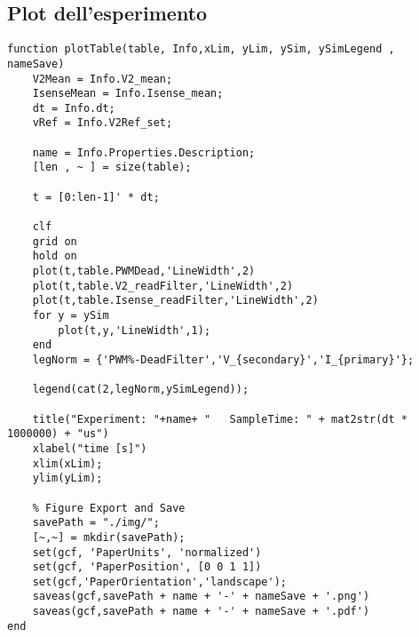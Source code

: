 \newpage

\subsection{Plot dell'esperimento}
\begin{lstlisting}[style=matlabStyle,caption={Plot dell'esperimento},label=lst:plotTable] 
function plotTable(table, Info,xLim, yLim, ySim, ySimLegend , nameSave)
	V2Mean = Info.V2_mean;
	IsenseMean = Info.Isense_mean;
	dt = Info.dt;
	vRef = Info.V2Ref_set;
	
	name = Info.Properties.Description;
	[len , ~ ] = size(table);
	
	t = [0:len-1]' * dt;
	
	clf
	grid on
	hold on
	plot(t,table.PWMDead,'LineWidth',2)
	plot(t,table.V2_readFilter,'LineWidth',2)
	plot(t,table.Isense_readFilter,'LineWidth',2)
	for y = ySim
		plot(t,y,'LineWidth',1);
	end
	legNorm = {'PWM%-DeadFilter','V_{secondary}','I_{primary}'};
	
	legend(cat(2,legNorm,ySimLegend));
	
	title("Experiment: "+name+ "   SampleTime: " + mat2str(dt * 1000000) + "us")
	xlabel("time [s]")
	xlim(xLim);
	ylim(yLim);
	
	% Figure Export and Save
	savePath = "./img/";
	[~,~] = mkdir(savePath);
	set(gcf, 'PaperUnits', 'normalized')
	set(gcf, 'PaperPosition', [0 0 1 1])
	set(gcf,'PaperOrientation','landscape');
	saveas(gcf,savePath + name + '-' + nameSave + '.png')
	saveas(gcf,savePath + name + '-' + nameSave + '.pdf')
end
\end{lstlisting}